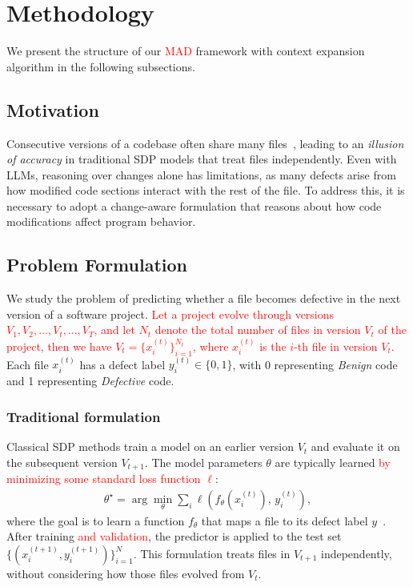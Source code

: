 \documentclass[authoryear,final,5p,times,twocolumn]{elsarticle}
\theoremstyle{plain}
\begin{document}
\section{Methodology}
\label{sec:methodology}

We present the structure of our \textcolor{red}{MAD} framework with context expansion algorithm in the following subsections.  

\subsection{Motivation}
\label{sec:motivation}
Consecutive versions of a codebase often share many files~\citep{thota2020survey}, leading to an \emph{illusion of accuracy} in traditional SDP models that treat files independently. 
Even with LLMs, reasoning over changes alone has limitations, as many defects arise from how modified code sections interact with the rest of the file.
To address this, it is necessary to adopt a change-aware formulation that reasons about how code modifications affect program behavior. 

\subsection{Problem Formulation}
\label{sec:problem_formulation}

We study the problem of predicting whether a file becomes defective in the next version of a software project. \textcolor{red}{Let a project evolve through versions
\(V_1, V_2, \dots, V_t , \dots, V_T\), and let $N_t$ denote the total number of files in version $V_t$ of the project, then we have
\(V_t = \{ x^{(t)}_i \}_{i=1}^{N_t}\), where $x^{(t)}_i$ is the $i$-th file in version $V_t$.} Each file $x^{(t)}_i$ has a defect label
\(y^{(t)}_i \in \{0,1\}\), with 0 representing \emph{Benign} code and 1 representing \emph{Defective} code.

\subsubsection{Traditional formulation}

Classical SDP methods train a model on an
earlier version \(V_t\) and evaluate it on the subsequent version
\(V_{t+1}\). The model parameters \(\theta\) are typically learned \textcolor{red}{by
minimizing some standard loss function $\ell$}:
\begin{align}
\theta^\star = \arg\min_\theta 
\sum_{i} \ell(f_\theta(x^{(t)}_i),\, y^{(t)}_i),
\end{align}
where the goal is to learn a function \(f_\theta\) that maps a file to its defect label \(y\)~\citep{akimova2021survey}. After training \textcolor{red}{ and validation}, the predictor is applied to the test set
$\{(x^{(t+1)}_i, y^{(t+1)}_i)\}_{i=1}^{N}$. This formulation treats files in
\(V_{t+1}\) independently, without considering how those files evolved
from \(V_t\). 
\end{document}
